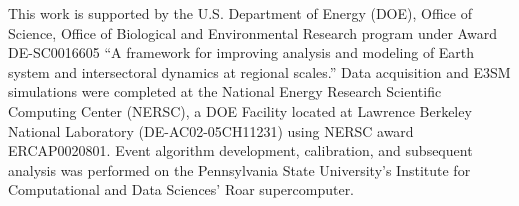 \documentclass[draft]{agujournal2019}
\begin{document}
%
%
%
%
%
%
%
%


\acknowledgments
This work is supported by the U.S. Department of Energy (DOE), Office of Science, Office of Biological and Environmental Research program under Award DE-SC0016605 ``A framework for improving analysis and modeling of Earth system and intersectoral dynamics at regional scales.'' Data acquisition and E3SM simulations were completed at the National Energy Research Scientific Computing Center (NERSC), a DOE Facility located at Lawrence Berkeley National Laboratory (DE-AC02-05CH11231) using NERSC award ERCAP0020801. Event algorithm development, calibration, and subsequent analysis was performed on the Pennsylvania State University's Institute for Computational and Data Sciences' Roar supercomputer.



%
%



%
%
%
%
%
\end{document}

